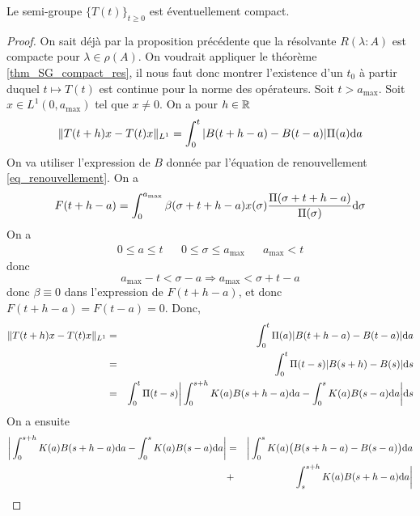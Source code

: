 \begin{proposition}\label{SG_T_compact}
    Le semi-groupe $\big\{T(t)\big\}_{t \geq 0}$ est éventuellement compact.
\end{proposition}

\begin{proof}
    On sait déjà par la proposition précédente que la résolvante $R(\lambda : A)$ est compacte pour $\lambda \in \rho(A)$. On voudrait appliquer le théorème \ref{thm_SG_compact_res}, il nous faut donc montrer l'existence d'un $t_0$ à partir duquel $t \mapsto T(t)$ est continue pour la norme des opérateurs. Soit $t > a_{\max}$. Soit $x \in L^1(0,a_{\max})$ tel que $x \neq 0$. On a pour $h \in \mathbb{R}$
    \begin{eqnarray*}
        \|T(t+h)x-T(t)x\|_{L^1} = \int_0^t |B(t+h-a)-B(t-a)|\Pi(a)\mathrm{d} a
    \end{eqnarray*}
    On va utiliser l'expression de $B$ donnée par l'équation de renouvellement \eqref{eq_renouvellement}. On a 
    \begin{equation*}
        F(t+h-a)=\int_0^{a_{\max}} \beta(\sigma + t+h-a)x(\sigma)\frac{\Pi(\sigma+t+h-a)}{\Pi(\sigma)}\mathrm{d} \sigma
    \end{equation*}
    On a 
    \begin{equation*}
        \begin{array}{ccccc}
            0 \leq a \leq t && 0 \leq \sigma \leq a_{\max} && a_{\max} < t
        \end{array}
    \end{equation*}
    donc 
    \begin{equation*}
        a_{\max} - t < \sigma - a \Longrightarrow a_{\max} < \sigma + t - a
    \end{equation*}
    donc $\beta \equiv 0$ dans l'expression de $F(t+h-a)$, et donc $F(t+h-a)=F(t-a)=0$. Donc,
    \begin{eqnarray*}
        \|T(t+h)x-T(t)x\|_{L^1} &=& \int_0^t\Pi(a) |B(t+h-a)-B(t-a)|\mathrm{d} a \\
        &=& \int_0^t \Pi(t-s)|B(s+h)-B(s)|\mathrm{d} s \\
        &=& \int_0^t \Pi(t-s)\bigg|\int_0^{s+h}K(a)B(s+h-a)\mathrm{d} a - \int_0^sK(a)B(s-a)\mathrm{d} a\bigg| \mathrm{d} s
    \end{eqnarray*}
    On a ensuite 
    \begin{eqnarray*}
        \bigg|\int_0^{s+h}K(a)B(s+h-a)\d a - \int_0^sK(a)B(s-a)\d a\bigg| &=& \bigg| \int_0^sK(a)\big(B(s+h-a)-B(s-a)\big)\d a \\
        &+& \int_s^{s+h}K(a)B(s+h-a)\d a \bigg|

\end{eqnarray*}
\end{proof}
